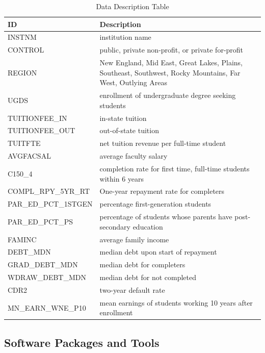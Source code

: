 \documentclass[10pt]{article}
\begin{document}
\begin{table}
\begin{center}
\begin{tabular}{ |P{4cm}|P{5cm}| }
 \hline ID & Description \\ \hline
 INSTNM & institution name \\ \hline 
 CONTROL & public, private non-profit, or private for-profit \\ \hline 
 REGION & New England,
Mid East, 
Great Lakes, 
Plains, 
Southeast,
Southwest,
Rocky Mountains, 
Far West, 
Outlying Areas
 \\ \hline 
 UGDS & enrollment of undergraduate degree seeking students\\ \hline  
 TUITIONFEE\_IN & in-state tuition \\ \hline 
 TUITIONFEE\_OUT & out-of-state tuition \\ \hline 
 TUITFTE & net tuition revenue per full-time student \\ \hline 
 AVGFACSAL & average faculty salary \\ \hline 
 C150\_4 & completion rate for first time, full-time students within 6 years \\ \hline 
 COMPL\_RPY\_5YR\_RT & One-year repayment rate for completers \\ \hline 
 PAR\_ED\_PCT\_1STGEN & percentage first-generation students \\ \hline 
 PAR\_ED\_PCT\_PS & percentage of students whose parents have post-secondary education \\ \hline 
 FAMINC & average family income \\ \hline 
 DEBT\_MDN & median debt upon start of repayment \\ \hline 
 GRAD\_DEBT\_MDN & median debt for completers \\ \hline 
 WDRAW\_DEBT\_MDN & median debt for not completed \\ \hline 
 CDR2 & two-year default rate \\ \hline 
 MN\_EARN\_WNE\_P10 & mean earnings of students working 10 years after enrollment \\ \hline 
\end{tabular}
\caption{Data Description Table}
\label{table:data}
\end{center}
\end{table}

\subsection{Software Packages and Tools}
\end{document}
